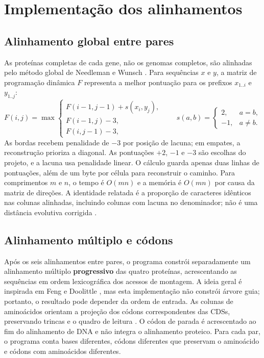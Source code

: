 \documentclass[12pt]{article}
\begin{document}
\section{Implementação dos alinhamentos}

\subsection{Alinhamento global entre pares}

As proteínas completas de cada gene, não os genomas completos, são alinhadas
pelo método global de Needleman e Wunsch \cite{needleman1970}. Para sequências
$x$ e $y$, a matriz de programação dinâmica $F$ representa a melhor pontuação
para os prefixos $x_{1..i}$ e $y_{1..j}$:
\begin{equation}
F(i,j)=\max\left\{\begin{array}{l}
F(i-1,j-1)+s(x_i,y_j),\\
F(i-1,j)-3,\\
F(i,j-1)-3,
\end{array}\right.
\qquad
s(a,b)=\begin{cases}2,&a=b,\\-1,&a\ne b.\end{cases}
\label{eq:nw}
\end{equation}
As bordas recebem penalidade de $-3$ por posição de lacuna; em empates, a
reconstrução prioriza a diagonal. As pontuações $+2$, $-1$ e $-3$ são escolhas
do projeto, e a lacuna usa penalidade linear. O cálculo guarda apenas duas
linhas de pontuações, além de um byte por célula para reconstruir o caminho.
Para comprimentos $m$ e $n$, o tempo é $O(mn)$ e a memória é $O(mn)$ por causa
da matriz de direções. A identidade relatada é a proporção de caracteres
idênticos nas colunas alinhadas, incluindo colunas com lacuna no denominador;
não é uma distância evolutiva corrigida \cite{yang2006}.

\subsection{Alinhamento múltiplo e códons}

Após os seis alinhamentos entre pares, o programa constrói separadamente um
alinhamento múltiplo \textbf{progressivo} das quatro proteínas, acrescentando
as sequências em ordem lexicográfica dos acessos de montagem. A ideia geral é
inspirada em Feng e Doolittle \cite{feng1987}, mas esta implementação não
constrói árvore guia; portanto, o resultado pode depender da ordem de entrada.
As colunas de aminoácidos orientam a projeção dos códons correspondentes das
CDSs, preservando trincas e o quadro de leitura \cite{suyama2006}. O códon de
parada é acrescentado ao fim do alinhamento de DNA e não integra o alinhamento
proteico. Para cada par, o programa conta bases diferentes, códons diferentes
que preservam o aminoácido e códons com aminoácidos diferentes.
\end{document}
